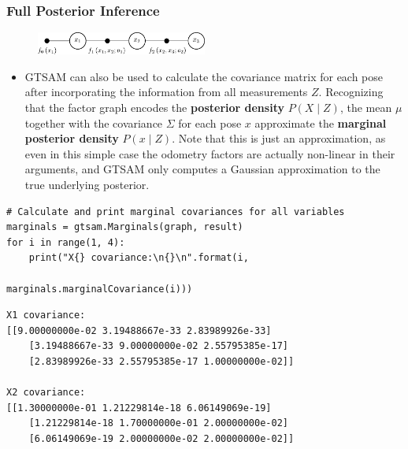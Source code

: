 \begin{frame}[fragile]
    \frametitle{Full Posterior Inference}

    \scriptsize

    \begin{figure}[!h]
        \includegraphics[width=0.5\textwidth]{./images/gtsam/factor_graph_odometry.pdf}
    \end{figure}

    \begin{itemize}
        \item GTSAM can also be used to calculate the covariance matrix for each pose after incorporating the information from all measurements $Z$. Recognizing that the factor graph encodes the \textbf{posterior density} $P(X \mid Z)$, the mean $\mu$ together with the covariance $\Sigma$ for each pose $x$ approximate the \textbf{marginal posterior density} $P(x \mid Z)$. Note that this is just an approximation, as even in this simple case the odometry factors are actually non-linear in their arguments, and GTSAM only computes a Gaussian approximation to the true underlying posterior.
    \end{itemize}

    \tiny

\begin{lstlisting}[style=python] 
# Calculate and print marginal covariances for all variables
marginals = gtsam.Marginals(graph, result)
for i in range(1, 4):
    print("X{} covariance:\n{}\n".format(i,
                                        marginals.marginalCovariance(i)))
\end{lstlisting}

\begin{lstlisting}[style=bash] 
X1 covariance:
[[9.00000000e-02 3.19488667e-33 2.83989926e-33]
    [3.19488667e-33 9.00000000e-02 2.55795385e-17]
    [2.83989926e-33 2.55795385e-17 1.00000000e-02]]

X2 covariance:
[[1.30000000e-01 1.21229814e-18 6.06149069e-19]
    [1.21229814e-18 1.70000000e-01 2.00000000e-02]
    [6.06149069e-19 2.00000000e-02 2.00000000e-02]]


\end{lstlisting}
\end{frame}
